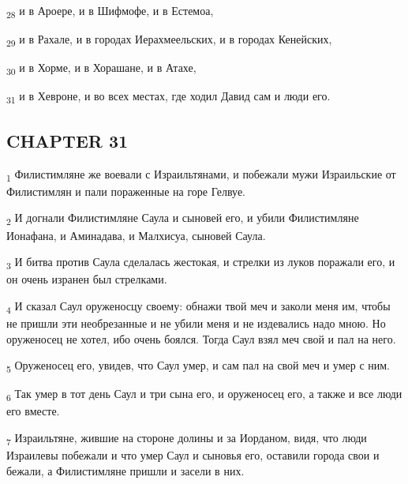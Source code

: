 \begin{tcolorbox}
\textsubscript{28} и в Ароере, и в Шифмофе, и в Естемоа,
\end{tcolorbox}
\begin{tcolorbox}
\textsubscript{29} и в Рахале, и в городах Иерахмеельских, и в городах Кенейских,
\end{tcolorbox}
\begin{tcolorbox}
\textsubscript{30} и в Хорме, и в Хорашане, и в Атахе,
\end{tcolorbox}
\begin{tcolorbox}
\textsubscript{31} и в Хевроне, и во всех местах, где ходил Давид сам и люди его.
\end{tcolorbox}
\subsection{CHAPTER 31}
\begin{tcolorbox}
\textsubscript{1} Филистимляне же воевали с Израильтянами, и побежали мужи Израильские от Филистимлян и пали пораженные на горе Гелвуе.
\end{tcolorbox}
\begin{tcolorbox}
\textsubscript{2} И догнали Филистимляне Саула и сыновей его, и убили Филистимляне Ионафана, и Аминадава, и Малхисуа, сыновей Саула.
\end{tcolorbox}
\begin{tcolorbox}
\textsubscript{3} И битва против Саула сделалась жестокая, и стрелки из луков поражали его, и он очень изранен был стрелками.
\end{tcolorbox}
\begin{tcolorbox}
\textsubscript{4} И сказал Саул оруженосцу своему: обнажи твой меч и заколи меня им, чтобы не пришли эти необрезанные и не убили меня и не издевались надо мною. Но оруженосец не хотел, ибо очень боялся. Тогда Саул взял меч свой и пал на него.
\end{tcolorbox}
\begin{tcolorbox}
\textsubscript{5} Оруженосец его, увидев, что Саул умер, и сам пал на свой меч и умер с ним.
\end{tcolorbox}
\begin{tcolorbox}
\textsubscript{6} Так умер в тот день Саул и три сына его, и оруженосец его, а также и все люди его вместе.
\end{tcolorbox}
\begin{tcolorbox}
\textsubscript{7} Израильтяне, жившие на стороне долины и за Иорданом, видя, что люди Израилевы побежали и что умер Саул и сыновья его, оставили города свои и бежали, а Филистимляне пришли и засели в них.
\end{tcolorbox}
